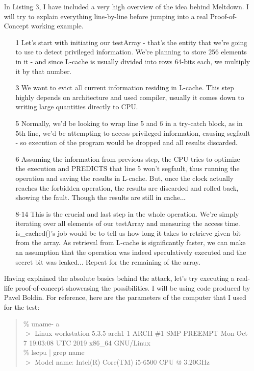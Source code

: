\documentclass{article}
\begin{document}
In Listing 3, I have included a very high overview of the idea behind Meltdown. I will try to explain everything line-by-line before jumping into a real Proof-of-Concept working example.
\begin{enumerate}

  \item [1] Let's start with initiating our testArray - that's the entity that we're going to use to detect privileged information. We're planning to store 256 elements in it - and since L-cache is usually divided into rows 64-bits each, we multiply it by that number. 
  \item [3] We want to evict all current information residing in L-cache. This step highly depends on architecture and used compiler, usually it comes down to writing large quantities directly to CPU.
  \item [5] Normally, we'd be looking to wrap line 5 and 6 in a try-catch block, as in 5th line, we'd be attempting to access privileged information, causing segfault - so execution of the program would be dropped and all results discarded.
  \item [6] Assuming the information from previous step, the CPU tries to optimize the execution and PREDICTS that line 5 won't segfault, thus running the operation and saving the results in L-cache. But, once the clock actually reaches the forbidden operation, the results are discarded and rolled back, showing the fault. Though the results are still in cache...
  \item [8-14] This is the crucial and last step in the whole operation. We're simply iterating over all elements of our testArray and measuring the access time. is\_cached()'s job would be to tell us how long it takes to retrieve given bit from the array. As retrieval from L-cache is significantly faster, we can make an assumption that the operation was indeed speculatively executed and the secret bit was leaked... Repeat for the remaining of the array.

\end{enumerate}

Having explained the absolute basics behind the attack, let's try executing a real-life proof-of-concept showcasing the possibilities. I will be using code produced by Pavel Boldin. For reference, here are the parameters of the computer that I used for the test:

\begin{quote}
\% uname- a 
\\ $>$ Linux workstation 5.3.5-arch1-1-ARCH \#1 SMP PREEMPT Mon Oct 7 19:03:08 UTC 2019 x86\_64 GNU/Linux 
\\ \% lscpu | grep name
\\ $>$ Model name: Intel(R) Core(TM) i5-6500 CPU @ 3.20GHz
\end{quote}
\end{document}
